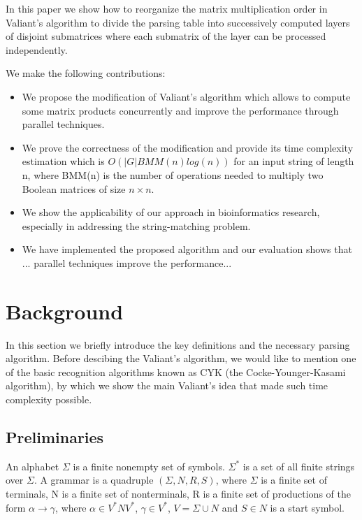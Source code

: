 \documentclass[runningheads]{llncs}
\begin{document}
In this paper we show how to reorganize the matrix multiplication order in Valiant's algorithm to divide the parsing table into successively computed layers of disjoint submatrices where each submatrix of the layer can be processed independently.

We make the following contributions:
\begin{itemize}
  \item We propose the modification of Valiant's algorithm which allows to compute some matrix products concurrently and improve the performance through parallel techniques.
  \item We prove the correctness of the modification and provide its time complexity estimation which is $O(|G|BMM(n)log(n))$ for an input string of length n, where BMM(n) is the number of operations needed to multiply two Boolean matrices of size $n \times n$. 
  \item We show the applicability of our approach in bioinformatics research, especially in addressing the string-matching problem.
  \item We have implemented the proposed algorithm and our evaluation shows that ... parallel techniques improve the performance...
\end{itemize}

\section{Background}

In this section we briefly introduce the key definitions and the necessary parsing algorithm. Before descibing the Valiant's  algorithm, we would like to mention one of the basic recognition algorithms known as CYK (the Cocke-Younger-Kasami algorithm), by which we show the main Valiant's idea that made such time complexity possible.

\subsection{Preliminaries}

An alphabet $\Sigma$ is a finite nonempty set of symbols. $\Sigma^{*}$ is a set of all finite strings over $\Sigma$. 
A grammar is a quadruple $(\Sigma, N, R, S)$, where $\Sigma$ is a finite set of terminals, N is a finite set of nonterminals, R is a finite set of productions of the form $\alpha \rightarrow \gamma$, where $\alpha \in V^{*}NV^{*}$, $\gamma \in V^{*}$, $V = \Sigma \cup N$ and $S \in N$ is a start symbol. 
\end{document}
